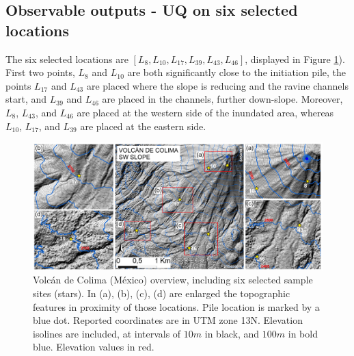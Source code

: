\documentclass{article}
\begin{document}
\subsection{Observable outputs - UQ on six selected locations}\label{Obs2}
The six selected locations are $[L_8, L_{10}, L_{17}, L_{39}, L_{43}, L_{46}]$, displayed in Figure \ref{fig:Colima-extra}). First two points, $L_8$ and $L_{10}$ are both significantly close to the initiation pile, the points $L_{17}$ and $L_{43}$ are placed where the slope is reducing and the ravine channels start, and $L_{39}$ and $L_{46}$ are placed in the channels, further down-slope. Moreover, $L_8$, $L_{43}$, and $L_{46}$ are placed at the western side of the inundated area, whereas $L_{10}$, $L_{17}$, and $L_{39}$ are placed at the eastern side.
\begin{figure}[H]
         \centering
        \includegraphics[width=1\textwidth]{BAF_VolcanDeColima/FigExtra.jpg}
        \caption{Volc{\'a}n de Colima (M{\'e}xico) overview, including six selected sample sites (stars). In (a), (b), (c), (d) are enlarged the topographic features in proximity of those locations. Pile location is marked by a blue dot. Reported coordinates are in UTM zone 13N. Elevation isolines are included, at intervals of $10 m$ in black, and $100m$ in bold blue. Elevation values in red.}
        \label{fig:Colima-extra}
\end{figure}
\end{document}
